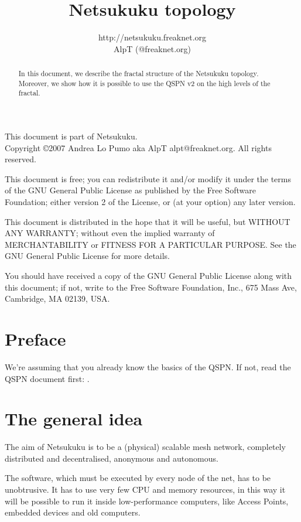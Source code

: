 \documentclass[a4paper]{article}
\title{Netsukuku topology}
\author{http://netsukuku.freaknet.org\\AlpT (@freaknet.org)}
\begin{document}
\maketitle
\begin{abstract}
	In this document, we describe the fractal structure of the Netsukuku
	topology. Moreover, we show how it is possible to use the QSPN v2 on
	the high levels of the fractal.
\end{abstract}
\pagebreak
\begin{small}
  This document is part of Netsukuku.\\
  Copyright \copyright 2007 Andrea Lo Pumo aka AlpT alpt@freaknet.org.
  All rights reserved.

  This document is free; you can redistribute it and/or modify it
  under the terms of the GNU General Public License as published by
  the Free Software Foundation; either version 2 of the License, or
  (at your option) any later version.

  This document is distributed in the hope that it will be useful, but
  WITHOUT ANY WARRANTY; without even the implied warranty of
  MERCHANTABILITY or FITNESS FOR A PARTICULAR PURPOSE\@.  See the GNU
  General Public License for more details.

  You should have received a copy of the GNU General Public License
  along with this document; if not, write to the Free Software
  Foundation, Inc., 675 Mass Ave, Cambridge, MA 02139, USA.
\end{small}

\clearpage
\tableofcontents
\clearpage
{}


\section{Preface}
\label{sec:preface}

We're assuming that you already know the basics of the QSPN. If not, read the
QSPN document first: \cite{qspndoc}.

\section{The general idea}
\label{sec:general_idea}

The aim of Netsukuku is to be a (physical) scalable mesh network, completely
distributed and decentralised, anonymous and autonomous.

The software, which must be executed by every node of the net, has to be
unobtrusive. It has to use very few CPU and memory resources, in this way it
will be possible to run it inside low-performance computers, like Access Points,
embedded devices and old computers.
\end{document}
